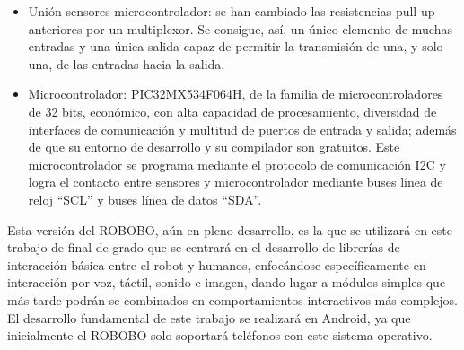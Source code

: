 \begin{itemize}
\begin{itemize}
	\end{itemize}
	\item Unión sensores-microcontrolador: se han cambiado las resistencias pull-up anteriores por un multiplexor. Se consigue, así, un único elemento de muchas entradas y una única salida capaz de permitir la transmisión de una, y solo una, de las entradas hacia la salida.

	\item Microcontrolador: PIC32MX534F064H, de la familia de microcontroladores de 32 bits, económico, con alta capacidad de procesamiento, diversidad de interfaces de comunicación y multitud de puertos de entrada y salida; además de que su entorno de desarrollo y su compilador son gratuitos. Este microcontrolador se programa mediante el protocolo de comunicación I2C y logra el contacto entre sensores y microcontrolador mediante buses línea de reloj “SCL” y buses línea de datos “SDA”.




\end{itemize}

Esta versión del ROBOBO, aún en pleno desarrollo, es la que se utilizará en este trabajo de final de grado que se centrará en el desarrollo de  librerías de interacción básica entre el robot y humanos, enfocándose específicamente en interacción por voz, táctil, sonido e imagen, dando lugar a módulos simples que más tarde podrán se combinados en comportamientos interactivos más complejos. El desarrollo fundamental de este trabajo se realizará en Android, ya que inicialmente el ROBOBO solo soportará teléfonos con este sistema operativo. 


